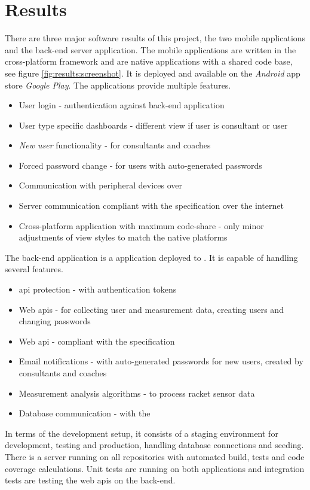 \chapter{Results}
There are three major software results of this project, the two mobile applications and the back-end server application.
The mobile applications are written in the cross-platform framework  and are native applications with a shared code base, see figure \ref{fig:results:screenshot}.
It is deployed and available on the \textit{Android} app store \textit{Google Play}.
The applications provide multiple features.


\begin{itemize}
\item User login - authentication against back-end application
\item User type specific dashboards - different view if user is consultant or user
\item \textit{New user} functionality - for consultants and coaches
\item Forced password change - for users with auto-generated passwords
\item Communication with peripheral devices over 
\item Server communication compliant with the  specification over the internet
\item Cross-platform application with maximum code-share - only minor adjustments of view styles to match the native platforms
\end{itemize}

The back-end application is a  application deployed to .
It is capable of handling several features.

\begin{itemize}
\item \Gls{api} protection - with authentication tokens
\item Web \glspl{api} - for collecting user and measurement data, creating users and changing passwords
\item Web \gls{api} - compliant with the  specification
\item Email notifications - with auto-generated passwords for new users, created by consultants and coaches
\item Measurement analysis algorithms - to process racket sensor data
\item Database communication - with the  
\end{itemize}

In terms of the development setup, it consists of a staging environment for development, testing and production, handling database connections and seeding.
There is a  server running on all repositories with automated build, tests and code coverage calculations.
Unit tests are running on both applications and integration tests are testing the web \glspl{api} on the back-end.

